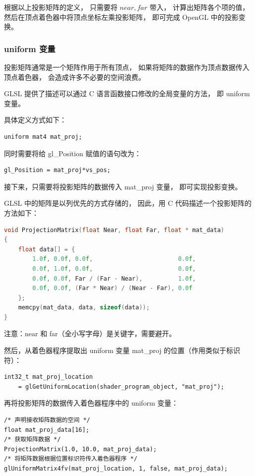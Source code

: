 \documentclass[fontset=windows]{ctexart}
\begin{document}
根据以上投影矩阵的定义，
只需要将 $near,far$ 带入，
计算出矩阵各个项的值，
然后在顶点着色器中将顶点坐标左乘投影矩阵，
即可完成 OpenGL 中的投影变换。

\subsubsection{uniform 变量}

投影矩阵通常是一个矩阵作用于所有顶点，
如果将矩阵的数据作为顶点数据传入顶点着色器，
会造成许多不必要的空间浪费。

GLSL 提供了描述可以通过 C 语言函数接口修改的全局变量的方法，
即 uniform 变量。

具体定义方式如下：
\begin{lstlisting}
uniform mat4 mat_proj;
\end{lstlisting}
同时需要将给 gl\_Position 赋值的语句改为：
\begin{lstlisting}
gl_Position = mat_proj*vs_pos;
\end{lstlisting}
接下来，只需要将投影矩阵的数据传入 mat\_proj 变量，
即可实现投影变换。

GLSL 中的矩阵是以列优先的方式存储的，
因此，用 C 代码描述一个投影矩阵的方法如下：

\begin{lstlisting}[language=c++]
void ProjectionMatrix(float Near, float Far, float * mat_data)
{
    float data[] = {
        1.0f, 0.0f, 0.0f,                        0.0f,
        0.0f, 1.0f, 0.0f,                        0.0f,
        0.0f, 0.0f, Far / (Far - Near),          1.0f,
        0.0f, 0.0f, (Far * Near) / (Near - Far), 0.0f
    };
    memcpy(mat_data, data, sizeof(data));
}
\end{lstlisting}

注意：near 和 far（全小写字母）是关键字，需要避开。

然后，从着色器程序提取出 uniform 变量 mat\_proj 的位置（作用类似于标识符）：

\begin{lstlisting}
int32_t mat_proj_location
    = glGetUniformLocation(shader_program_object, "mat_proj");
\end{lstlisting}

再将投影矩阵的数据传入着色器程序中的 uniform 变量：

\begin{lstlisting}
/* 声明接收矩阵数据的空间 */
float mat_proj_data[16];
/* 获取矩阵数据 */
ProjectionMatrix(1.0, 10.0, mat_proj_data);
/* 将矩阵数据根据位置标识符传入着色器程序 */
glUniformMatrix4fv(mat_proj_location, 1, false, mat_proj_data);
\end{lstlisting}
\end{document}
